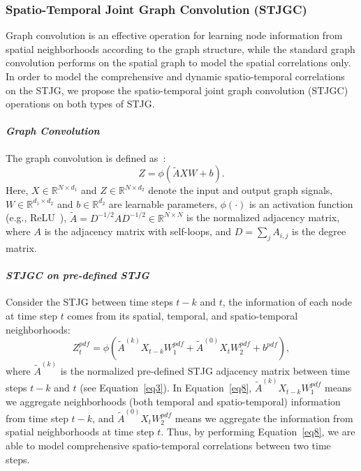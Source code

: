 \documentclass[10pt,journal,compsoc]{IEEEtran}
\begin{document}
\subsubsection{Spatio-Temporal Joint Graph Convolution (STJGC)} \label{Spatio-Temporal Joint Graph Convolution (STJGC)}

Graph convolution is an effective operation for learning node information from spatial neighborhoods according to the graph structure, while the standard graph convolution performs on the spatial graph to model the spatial correlations only. In order to model the comprehensive and dynamic spatio-temporal correlations on the STJG, we propose the spatio-temporal joint graph convolution (STJGC) operations on both types of STJG.

\paragraph{\textit{Graph Convolution}} The graph convolution is defined as~\cite{Kipf-and-Welling:ICLR2017}:
%
\begin{equation}
Z=\phi(\tilde{A}XW+b).
\label{eq7}
\end{equation}
%   
Here, $ X \in \mathbb{R}^{N \times d_1} $ and $ Z \in \mathbb{R}^{N \times d_2} $ denote the input and output graph signals, $ W \in \mathbb{R}^{d_1 \times d_2} $ and $ b \in \mathbb{R}^{d_2} $ are learnable parameters, $ \phi(\cdot) $ is an activation function (e.g., ReLU~\cite{Nair-and-Hinton:ICML2010}), $ \tilde{A}=D^{-1/2}AD^{-1/2} \in \mathbb{R}^{N \times N} $ is the normalized adjacency matrix, where $ A $ is the adjacency matrix with self-loops, and $ D=\sum_{j}A_{i, j} $ is the degree matrix.

\paragraph{\textbf{\textit{STJGC on pre-defined STJG}}}

Consider the STJG between time steps $ t-k $ and $ t $, the information of each node at time step $ t $ comes from its spatial, temporal, and spatio-temporal neighborhoods:
%
\begin{equation}
Z_t^{pdf}=\phi(\tilde{A}^{(k)}X_{t-k}W_1^{pdf}+\tilde{A}^{(0)}X_tW_2^{pdf}+b^{pdf}),
\label{eq8}
\end{equation}
%
where $ \tilde{A}^{(k)} $ is the normalized pre-defined STJG adjacency matrix between time steps $ t-k $ and $ t $ (see Equation~\ref{eq3}). In Equation~\ref{eq8}, $ \tilde{A}^{(k)}X_{t-k}W_1^{pdf} $ means we aggregate neighborhoods (both temporal and spatio-temporal) information from time step $ t-k $, and $ \tilde{A}^{(0)}X_tW_2^{pdf} $ means we aggregate the information from spatial neighborhoods at time step $ t $. Thus, by performing Equation~\ref{eq8}, we are able to model comprehensive spatio-temporal correlations between two time steps.
\end{document}
